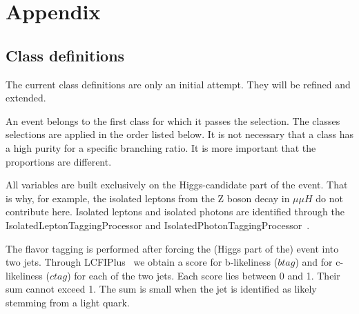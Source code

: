 \documentclass[11pt, hidelinks, a4paper]{scrartcl}
\begin{document}
\begin{thebibliography}{10}
{  }
  \end{thebibliography}\endgroup %

  \newpage
  \appendix
  \section*{Appendix}
  \subsection*{Class definitions}
  The current class definitions are only an initial attempt.
  They will be refined and extended.

  An event belongs to the first class for which it passes the selection.
  The classes selections are applied in the order listed below.
  It is not necessary that a class has a high purity for a specific branching ratio.
  It is more important that the proportions are different.

  All variables are built exclusively on the Higgs-candidate part of the event.
  That is why, for example, the isolated leptons
  from the Z boson decay in $\mu \mu H$ do not contribute here.
  Isolated leptons and isolated photons are identified through the
  IsolatedLeptonTaggingProcessor
  and IsolatedPhotonTaggingProcessor~\cite{ILCSoft}.

  The flavor tagging is performed after forcing the (Higgs part of the)
  event into two jets.
  Through LCFIPlus~\cite{LCFIPlus} we obtain a score for b-likeliness ($btag$)
  and for c-likeliness ($ctag$) for each of the two jets.
  Each score lies between 0 and 1.
  Their sum cannot exceed 1.
  The sum is small when the jet is identified as likely stemming from a light quark.
\end{document}
